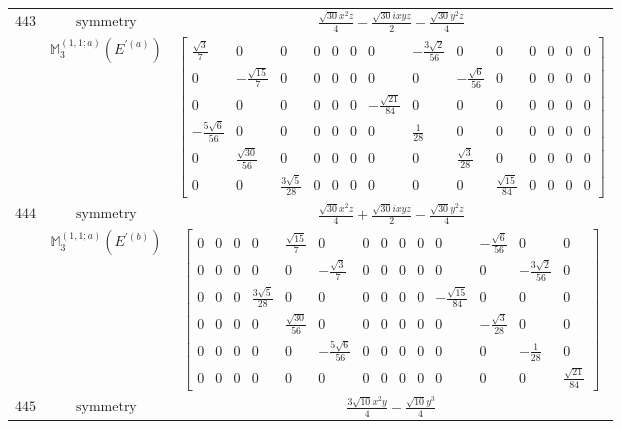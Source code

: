 \documentclass[fleqn,8pt,landscape]{jsarticle}
\begin{document}
\begin{longtable}{ccc}
$ 443 $ & $ \text{symmetry} $ & $ \frac{\sqrt{30} x^{2} z}{4} - \frac{\sqrt{30} i x y z}{2} - \frac{\sqrt{30} y^{2} z}{4} $ \\
$  $ & $ \mathbb{M}_{3}^{(1,1;a)}(E^{\prime(a)}) $ & $ \begin{bmatrix} \frac{\sqrt{3}}{7} & 0 & 0 & 0 & 0 & 0 & 0 & - \frac{3 \sqrt{2}}{56} & 0 & 0 & 0 & 0 & 0 & 0 \\ 0 & - \frac{\sqrt{15}}{7} & 0 & 0 & 0 & 0 & 0 & 0 & - \frac{\sqrt{6}}{56} & 0 & 0 & 0 & 0 & 0 \\ 0 & 0 & 0 & 0 & 0 & 0 & - \frac{\sqrt{21}}{84} & 0 & 0 & 0 & 0 & 0 & 0 & 0 \\ - \frac{5 \sqrt{6}}{56} & 0 & 0 & 0 & 0 & 0 & 0 & \frac{1}{28} & 0 & 0 & 0 & 0 & 0 & 0 \\ 0 & \frac{\sqrt{30}}{56} & 0 & 0 & 0 & 0 & 0 & 0 & \frac{\sqrt{3}}{28} & 0 & 0 & 0 & 0 & 0 \\ 0 & 0 & \frac{3 \sqrt{5}}{28} & 0 & 0 & 0 & 0 & 0 & 0 & \frac{\sqrt{15}}{84} & 0 & 0 & 0 & 0 \end{bmatrix} $ \\ \hline
$ 444 $ & $ \text{symmetry} $ & $ \frac{\sqrt{30} x^{2} z}{4} + \frac{\sqrt{30} i x y z}{2} - \frac{\sqrt{30} y^{2} z}{4} $ \\
$  $ & $ \mathbb{M}_{3}^{(1,1;a)}(E^{\prime(b)}) $ & $ \begin{bmatrix} 0 & 0 & 0 & 0 & \frac{\sqrt{15}}{7} & 0 & 0 & 0 & 0 & 0 & 0 & - \frac{\sqrt{6}}{56} & 0 & 0 \\ 0 & 0 & 0 & 0 & 0 & - \frac{\sqrt{3}}{7} & 0 & 0 & 0 & 0 & 0 & 0 & - \frac{3 \sqrt{2}}{56} & 0 \\ 0 & 0 & 0 & \frac{3 \sqrt{5}}{28} & 0 & 0 & 0 & 0 & 0 & 0 & - \frac{\sqrt{15}}{84} & 0 & 0 & 0 \\ 0 & 0 & 0 & 0 & \frac{\sqrt{30}}{56} & 0 & 0 & 0 & 0 & 0 & 0 & - \frac{\sqrt{3}}{28} & 0 & 0 \\ 0 & 0 & 0 & 0 & 0 & - \frac{5 \sqrt{6}}{56} & 0 & 0 & 0 & 0 & 0 & 0 & - \frac{1}{28} & 0 \\ 0 & 0 & 0 & 0 & 0 & 0 & 0 & 0 & 0 & 0 & 0 & 0 & 0 & \frac{\sqrt{21}}{84} \end{bmatrix} $ \\ \hline
$ 445 $ & $ \text{symmetry} $ & $ \frac{3 \sqrt{10} x^{2} y}{4} - \frac{\sqrt{10} y^{3}}{4} $ \\

\end{longtable}
\end{document}
